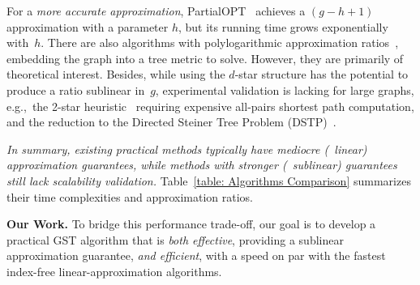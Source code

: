 For a \emph{more accurate approximation}, PartialOPT~\cite{ImprovAPP} achieves a $(g-h+1)$ approximation with a parameter $h$, but its running time grows exponentially with~$h$. There are also algorithms with polylogarithmic approximation ratios~\cite{PolyAppr_1, PolyAppr_2}, embedding the graph into a tree metric to solve. However, they are primarily of theoretical interest.
Besides, while using the $d$-star structure has the potential to produce a ratio sublinear in~$g$, experimental validation is lacking for large graphs, e.g.,~the 2-star heuristic~\cite{dstar1,dstar2} requiring expensive all-pairs shortest path computation, and the reduction to the Directed Steiner Tree Problem (DSTP)~\cite{D_STP}.

\emph{In summary, existing practical methods typically have mediocre (~linear) approximation guarantees, while methods with stronger (~sublinear) guarantees still lack scalability validation.} Table~\ref{table: Algorithms Comparison} summarizes their time complexities and approximation ratios.

\textbf{Our Work.}
To bridge this performance trade-off, our goal is to develop a practical GST algorithm that is \emph{both effective}, providing a sublinear approximation guarantee, \emph{and efficient}, with a speed on par with the fastest index-free linear-approximation algorithms.

